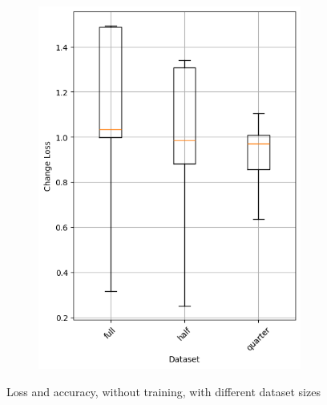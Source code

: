 \begin{figure}
\begin{subfigure}{0.5\textwidth}
        \includegraphics[width=0.95\textwidth]{plots/Dataset_NotTrained_loss.png}
    \end{subfigure}
    \caption{Loss and accuracy, without training, with different dataset sizes}
    \label{fig:dataset-size-notraining}
\end{figure}
